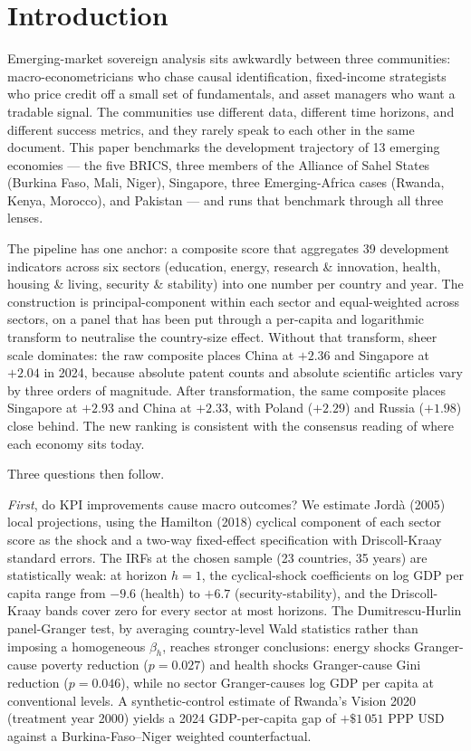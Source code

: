 \section{Introduction}\label{sec:intro}

Emerging-market sovereign analysis sits awkwardly between three communities: macro-econometricians who chase causal identification, fixed-income strategists who price credit off a small set of fundamentals, and asset managers who want a tradable signal. The communities use different data, different time horizons, and different success metrics, and they rarely speak to each other in the same document. This paper benchmarks the development trajectory of 13 emerging economies --- the five BRICS, three members of the Alliance of Sahel States (Burkina Faso, Mali, Niger), Singapore, three Emerging-Africa cases (Rwanda, Kenya, Morocco), and Pakistan --- and runs that benchmark through all three lenses.

The pipeline has one anchor: a composite score that aggregates 39 development indicators across six sectors (education, energy, research \& innovation, health, housing \& living, security \& stability) into one number per country and year. The construction is principal-component within each sector and equal-weighted across sectors, on a panel that has been put through a per-capita and logarithmic transform to neutralise the country-size effect. Without that transform, sheer scale dominates: the raw composite places China at $+2.36$ and Singapore at $+2.04$ in 2024, because absolute patent counts and absolute scientific articles vary by three orders of magnitude. After transformation, the same composite places Singapore at $+2.93$ and China at $+2.33$, with Poland ($+2.29$) and Russia ($+1.98$) close behind. The new ranking is consistent with the consensus reading of where each economy sits today.

Three questions then follow.

\emph{First}, do KPI improvements cause macro outcomes? We estimate Jord{\`a} (2005) local projections, using the Hamilton (2018) cyclical component of each sector score as the shock and a two-way fixed-effect specification with Driscoll-Kraay standard errors. The IRFs at the chosen sample (23 countries, 35 years) are statistically weak: at horizon $h=1$, the cyclical-shock coefficients on log GDP per capita range from $-9.6$ (health) to $+6.7$ (security-stability), and the Driscoll-Kraay bands cover zero for every sector at most horizons. The Dumitrescu-Hurlin panel-Granger test, by averaging country-level Wald statistics rather than imposing a homogeneous $\beta_h$, reaches stronger conclusions: energy shocks Granger-cause poverty reduction ($p = 0.027$) and health shocks Granger-cause Gini reduction ($p = 0.046$), while no sector Granger-causes log GDP per capita at conventional levels. A synthetic-control estimate of Rwanda's Vision 2020 (treatment year 2000) yields a 2024 GDP-per-capita gap of $+\$1\,051$ PPP USD against a Burkina-Faso--Niger weighted counterfactual.

